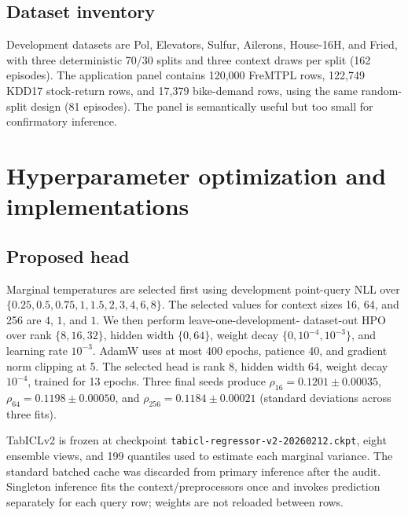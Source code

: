 \subsection{Dataset inventory}

\begin{table}[h]
\caption{All 35 evaluation datasets.  Rows are the full task size; each
episode nevertheless uses at most 256 context and 48 query observations.}
\label{tab:datasets}
\centering
\scriptsize
\resizebox{\linewidth}{!}{}
\end{table}

Development datasets are Pol, Elevators, Sulfur, Ailerons, House-16H, and
Fried, with three deterministic 70/30 splits and three context draws per split
(162 episodes).  The application panel contains 120,000 FreMTPL rows,
122,749 KDD17 stock-return rows, and 17,379 bike-demand rows, using the same
random-split design (81 episodes).  The panel is semantically useful but too
small for confirmatory inference.

\section{Hyperparameter optimization and implementations}\label{app:hpo}

\subsection{Proposed head}

Marginal temperatures are selected first using development point-query NLL
over
$\{0.25,0.5,0.75,1,1.5,2,3,4,6,8\}$.  The selected values for context sizes
16, 64, and 256 are $4$, $1$, and $1$.  We then perform leave-one-development-
dataset-out HPO over rank $\{8,16,32\}$, hidden width $\{0,64\}$, weight decay
$\{0,10^{-4},10^{-3}\}$, and learning rate $10^{-3}$.  AdamW uses at most 400
epochs, patience 40, and gradient norm clipping at 5.  The selected head is
rank 8, hidden width 64, weight decay $10^{-4}$, trained for 13 epochs.  Three
final seeds produce
$\rho_{16}=0.1201\pm0.00035$,
$\rho_{64}=0.1198\pm0.00050$, and
$\rho_{256}=0.1184\pm0.00021$ (standard deviations across three fits).

TabICLv2 is frozen at checkpoint
\texttt{tabicl-regressor-v2-20260212.ckpt}, eight ensemble views, and 199
quantiles used to estimate each marginal variance.  The standard batched cache
was discarded from primary inference after the audit.  Singleton inference
fits the context/preprocessors once and invokes prediction separately for each
query row; weights are not reloaded between rows.

